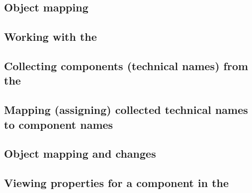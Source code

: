 \subsection{Object mapping}
\label{objectmappingtasks}


\subsection{Working with the \gdomeditor{}}
\label{TasksObjectMappingEditor}


\subsection{Collecting components (technical names) from the \gdaut{}}
\label{TasksOMCollect}


\subsection{Mapping (assigning) collected technical names to component names}
\label{TasksOMMap}


\subsection{Object mapping and \gdaut{} changes}


\subsection{Viewing properties for a component in the \gdomm{}}
\label{TasksOMProperties}

